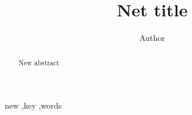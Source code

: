 
\title{Net title
}

\author[label1]{Author}
\address[label1]{ZJU}
\begin{abstract}
New abstract

\end{abstract}

\begin{keyword}
new \sep key \sep words
\end{keyword}